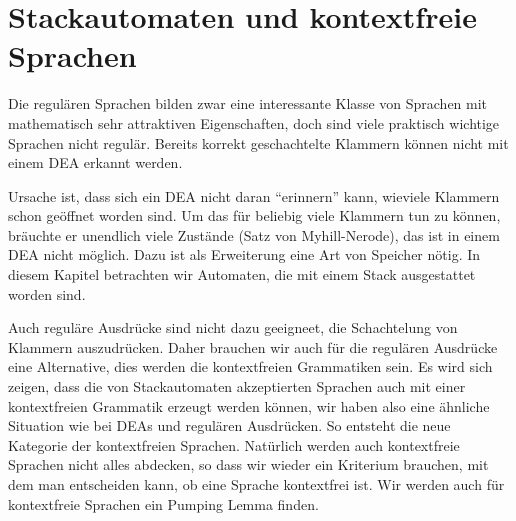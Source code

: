 %
%
%
\chapter{Stackautomaten und kontextfreie Sprachen\label{chapter-cfl}}
Die regulären Sprachen bilden zwar eine interessante Klasse
von Sprachen mit mathematisch sehr attraktiven Eigenschaften,
doch sind viele praktisch wichtige Sprachen nicht regulär.
Bereits korrekt geschachtelte Klammern können nicht mit einem
DEA erkannt werden.

Ursache ist, dass sich ein DEA nicht
daran ``erinnern'' kann, wieviele Klammern schon geöffnet
worden sind.
Um das für beliebig viele Klammern tun zu können,
bräuchte er unendlich viele Zustände (Satz von Myhill-Nerode),
das ist in einem DEA nicht möglich.
Dazu ist als Erweiterung
eine Art von Speicher nötig.
In diesem Kapitel betrachten
wir Automaten, die mit einem Stack ausgestattet worden sind.

%
%
Auch reguläre Ausdrücke sind nicht dazu geeigneet, die Schachtelung
von Klammern auszudrücken.
Daher brauchen wir auch für die
regulären Ausdrücke eine Alternative, dies werden die kontextfreien
Grammatiken sein.
Es wird sich zeigen, dass die von Stackautomaten
akzeptierten Sprachen auch mit einer kontextfreien Grammatik erzeugt
werden können, wir haben also eine ähnliche Situation wie
bei DEAs und regulären Ausdrücken.
So entsteht die neue Kategorie der kontextfreien Sprachen.
%
Natürlich werden auch kontextfreie Sprachen nicht alles
abdecken, so dass wir wieder ein Kriterium brauchen, mit dem
man entscheiden kann, ob eine Sprache kontextfrei ist.
Wir werden auch für kontextfreie Sprachen ein Pumping Lemma finden.






